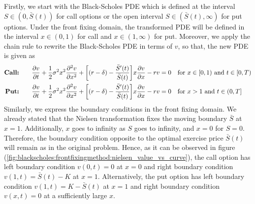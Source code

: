 Firstly, we start with the Black-Scholes PDE which is defined at the interval 
$S\in(0, \bar{S}(t))$ for call options or the open interval $S\in(\bar{S}(t), \infty)$ for put options. Under the front fixing domain, the transformed PDE will be defined in the interval $x\in(0, 1)$ for call and $x\in(1, \infty)$ for put. Moreover, we apply the chain rule to rewrite the Black-Scholes PDE in terms of $v$, so that, the new PDE is given as
\begin{subequations} \label{eq:blackscholes:frontfixingmethod:nielsen:american_options_pde}
  \begin{align}
    \text{\textbf{Call:}} \qquad
    \dfrac{\partial{v}}{\partial{t}} + \dfrac{1}{2}\sigma^{2} x^2 \dfrac{\partial^2{v}}{\partial{x}^2} + \bigg[(r - \delta) - \dfrac{\bar{S}^\prime(t)}{\bar{S}(t)}\bigg]x\dfrac{\partial{v}}{\partial{x}} - rv = 0 \quad & \text{for $x \in [0, 1)$ and $t \in [0, T)$} \\
    \text{\textbf{Put:}} \qquad
    \dfrac{\partial{v}}{\partial{t}} + \dfrac{1}{2}\sigma^{2} x^2 \dfrac{\partial^2{v}}{\partial{x}^2} + \bigg[(r - \delta) - \dfrac{\bar{S}^\prime(t)}{\bar{S}(t)}\bigg]x\dfrac{\partial{v}}{\partial{x}} - rv = 0 \quad & \text{for $x > 1$ and $t \in (0, T]$}
  \end{align}
\end{subequations}
Similarly, we express the boundary conditions in the front fixing domain. We already stated that the Nielsen transformation fixes the moving boundary $\bar{S}$ at $x=1$. Additionally, $x$ goes to infinity as $S$ goes to infinity, and $x=0$ for $S=0$. Therefore, the boundary condition opposite to the optimal exercise price $\bar{S}(t)$ will remain as in the original problem. Hence,
as it can be observed in figure (\ref{fig:blackscholes:frontfixingmethod:nielsen_value_vs_curve}), the call option has left boundary condition $v(0, t) = 0$ at $x=0$ and right boundary condition $v(1, t) = \bar{S}(t) - K$ at $x=1$. Alternatively, 
the put option has left boundary condition $v(1, t) = K - \bar{S}(t)$ at $x=1$ and right boundary condition $v(x, t) = 0$ at a sufficiently large $x$.
